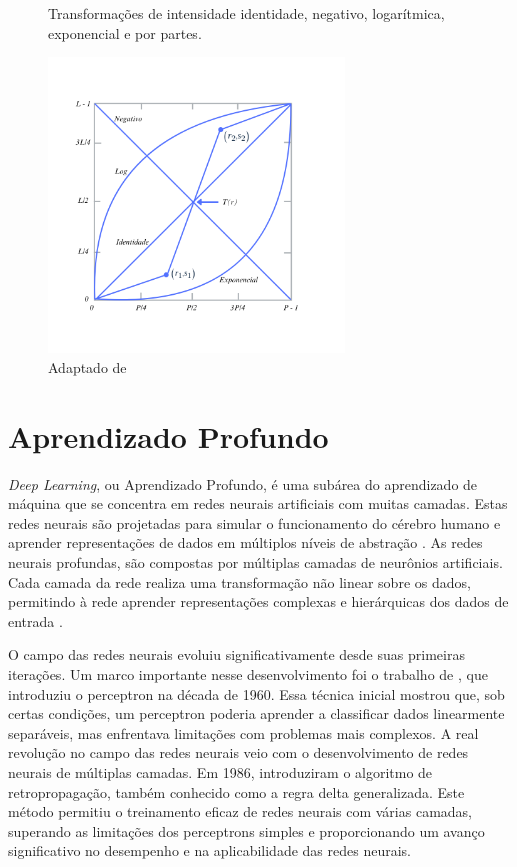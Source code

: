 \begin{figure}[h!]
    \centering  
    \caption{Transformações de intensidade identidade, negativo, logarítmica, exponencial e por partes.} 
    \includegraphics[width=0.7\textwidth]{fig/transform3.png}
    \caption*{Adaptado de }
    \label{fig:transform3}
\end{figure}

\newpage

\section{Aprendizado Profundo}

\textit{Deep Learning}, ou Aprendizado Profundo, é uma subárea do aprendizado de máquina que se concentra em redes neurais artificiais com muitas camadas. Estas redes neurais são projetadas para simular o funcionamento do cérebro humano e aprender representações de dados em múltiplos níveis de abstração \cite{goodfellow2016deep}.
As redes neurais profundas, são compostas por múltiplas camadas de neurônios artificiais. Cada camada da rede realiza uma transformação não linear sobre os dados, permitindo à rede aprender representações complexas e hierárquicas dos dados de entrada \cite{haykin2001redes}.


O campo das redes neurais evoluiu significativamente desde suas primeiras iterações. Um marco importante nesse desenvolvimento foi o trabalho de , que introduziu o perceptron na década de 1960. Essa técnica inicial mostrou que, sob certas condições, um perceptron poderia aprender a classificar dados linearmente separáveis, mas enfrentava limitações com problemas mais complexos.
A real revolução no campo das redes neurais veio com o desenvolvimento de redes neurais de múltiplas camadas. Em 1986,  introduziram o algoritmo de retropropagação, também conhecido como a regra delta generalizada. Este método permitiu o treinamento eficaz de redes neurais com várias camadas, superando as limitações dos perceptrons simples e proporcionando um avanço significativo no desempenho e na aplicabilidade das redes neurais.

